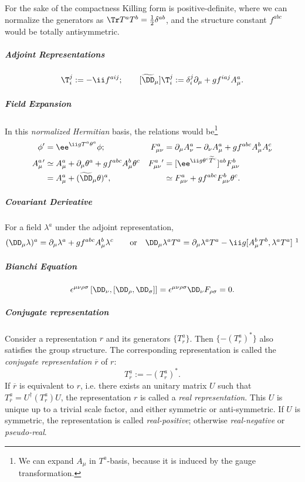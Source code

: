 For the sake of the compactness Killing form is positive-definite, where we can normalize the generators as $\Tr T^aT^b=\frac12\delta^{ab}$, and the structure constant $f^{abc}$ would be totally antisymmetric.

\subparagraph{Adjoint Representations}
\begin{equation}
 [\tilde T^a]\T_i^j:=-\ii f^{aij};\qquad
[\tilde\Dm]\T_i^j:=\delta_i^j\Pm+gf^{iaj}A^a_\mu.
\end{equation}

\subparagraph{Field Expansion}
In this {\em normalized Hermitian} basis, the relations would be\footnote{We can expand $A_\mu$ in $T^a$-basis, because it is induced by the gauge transformation.}
\begin{align*}
\phi'&=\ee^{\ii gT^a\theta^a}\phi;&
F_{\mu\nu}^a  &= \Pm A_\nu^a-\Pn A_\mu^a + gf^{abc}A_\mu^bA_\nu^c\\
A_\mu^a{}'&\simeq A_\mu^a+\Pm\theta^a+gf^{abc}A_\mu^b\theta^c&
F^a_{\mu\nu}{}'&=[\ee^{\ii g\theta^c\tilde T^c}]^{ab}F^b_{\mu\nu}\\
         &=A_\mu^a+(\tilde\Dm\theta)^a,&
&\simeq F_{\mu\nu}^a+gf^{abc}F^b_{\mu\nu}\theta^c.
\end{align*}

\subparagraph{Covariant Derivative}
For a field $\lambda^a$ under the adjoint representation,
\begin{equation}
 (\Dm\lambda)^a   = \Pm\lambda^a    + g f^{abc} A_\mu^b \lambda^c\qquad\text{or}\quad
  \Dm\lambda^aT^a = \Pm\lambda^aT^a - \ii g [A_\mu^bT^b,\lambda^aT^a]\ \footnotemark
\end{equation}

\subparagraph{Bianchi Equation}
\begin{equation}
 \epsilon^{\mu\nu\rho\sigma}\left[\Dn,\left[\Dr,\Ds\right]\right] = \epsilon^{\mu\nu\rho\sigma}\Dn F_{\rho\sigma} = 0.
\end{equation}

\subparagraph{Conjugate representation}
Consider a representation $r$ and its generators $\{T_r^a\}$.
Then $\{-(T_r^a)^*\}$ also satisfies the group structure.
The corresponding representation is called the {\em conjugate representation} $\overline r$ of $r$:
\begin{equation}
 T_{\overline r}^a:=-(T_r^a)^*.
\end{equation}
If $\overline r$ is equivalent to $r$, i.e. there exists an unitary matrix $U$ such that
$T_{\overline r}^a=U^\dagger(T_r^a)U$, the representation $r$ is called a {\em real representation}.
This $U$ is unique up to a trivial scale factor, and either symmetric or anti-symmetric.
If $U$ is symmetric, the representation is called {\em real-positive}; otherwise {\em real-negative} or {\em pseudo-real}.

